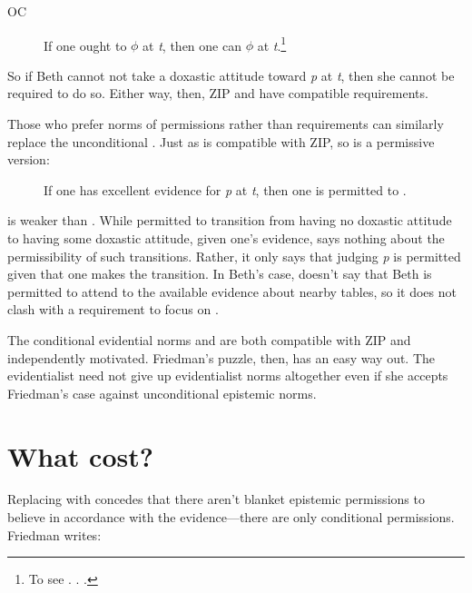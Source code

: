 \documentclass[12pt]{article}
\begin{document}
\newcommand{\oc}{OC}
\begin{description}
    \item[\oc{}] If one ought to $\phi$ at \textit{t}, then one can $\phi$ at \textit{t}.\footnote{To see . . . }
\end{description}
%
So if Beth cannot not take a doxastic attitude toward \textit{p} at \textit{t}, then she cannot be required to do so. Either way, then, ZIP and \eoc{} have compatible requirements.

Those who prefer norms of permissions rather than requirements can similarly replace the unconditional \ep{}. Just as \eoc{} is compatible with ZIP, so is a permissive version:

\begin{description}
    \item[\epc] If one has excellent evidence for \textit{p} at \textit{t}, then one is permitted to \judif{}.
\end{description}
%
\epc{} is weaker than \ep{}. While \ep{} permitted to transition from having no doxastic attitude to having some doxastic attitude, given one's evidence, \epc{} says nothing about the permissibility of such transitions. Rather, it only says that judging \textit{p} is permitted given that one makes the transition. In Beth's case, \epc{} doesn't say that Beth is permitted to attend to the available evidence about nearby tables, so it does not clash with a requirement to focus on .

The conditional evidential norms \eoc{} and \epc{} are both compatible with ZIP and independently motivated. Friedman's puzzle, then, has an easy way out. The evidentialist need not give up evidentialist norms altogether even if she accepts Friedman's case against unconditional epistemic norms.

\section{What cost?}

Replacing \ep{} with \epc{} concedes that there aren't blanket epistemic permissions to believe in accordance with the evidence---there are only conditional permissions. Friedman writes:
\end{document}
